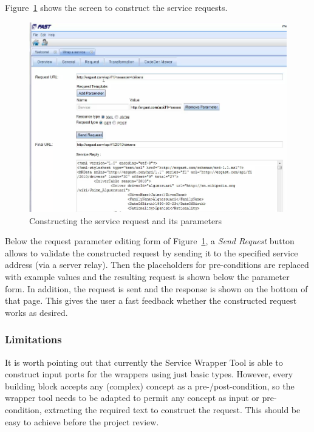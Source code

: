\documentclass{fast_latex}
\begin{document}
Figure~\ref{fig:construct_service_request} shows the screen to construct the service requests.

\begin{figure}
  \begin{center}
    \includegraphics[width=\linewidth]{images/ServiceWrapperToolGVSRequestTemplate.png}
    \caption{Constructing the service request and its parameters}
    \label{fig:construct_service_request}
  \end{center}
\end{figure}


Below the request parameter editing form of Figure~\ref{fig:construct_service_request}, a \textit{Send Request} button allows to validate the constructed request by sending it to the specified service address (via a server relay). Then the placeholders for pre-conditions are replaced with example values and the resulting request is shown below the parameter form. In addition, the request is sent and the response is shown on the bottom of that page. This gives the user a fast feedback whether the constructed request works as desired. 

\subsubsection{Limitations} %
\label{ssub:limitations}

It is worth pointing out that currently the Service Wrapper Tool is able to construct input ports for the wrappers using just basic types. However, every building block accepts any (complex) concept as a pre-/post-condition, so the wrapper tool needs to be adapted to permit any concept as input or pre-condition, extracting the required text to construct the request. This should be easy to achieve before the project review. 
\end{document}
